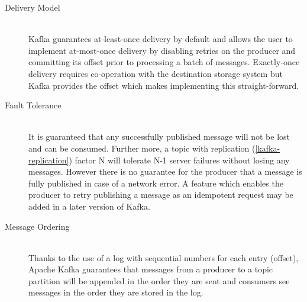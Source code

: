 \begin{description}

\item[Delivery Model] \hfill \\
    Kafka guarantees at-least-once delivery by default and allows the user to
    implement at-most-once delivery by disabling retries on the producer and
    committing its offset prior to processing a batch of messages. Exactly-once
    delivery requires co-operation with the destination storage system but Kafka
    provides the offset which makes implementing this
    straight-forward.\cite{apachekafka}

\item[Fault Tolerance] \hfill \\
    It is guaranteed that any successfully published message will not be lost
    and can be consumed. Further more, a topic with replication
    (\ref{kafka-replication}) factor N will tolerate N-1 server failures without
    losing any messages. However there is no guarantee for the producer that
    a message is fully published in case of a network error. A feature which
    enables the producer to retry publishing a message as an idempotent
    request may be added in a later version of Kafka. \cite{apachekafka}

\item[Message Ordering] \hfill \\
    Thanks to the use of a log with sequential numbers for each entry (offset),
    Apache Kafka guarantees that messages from a producer to a topic partition
    will be appended in the order they are sent and consumers see messages
    in the order they are stored in the log. \cite{apachekafka}

\end{description}

